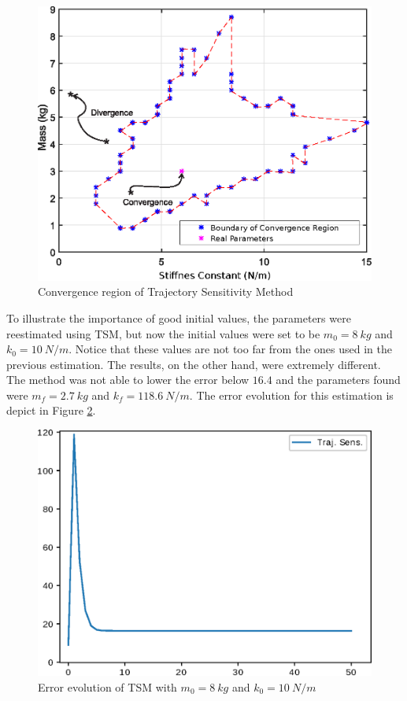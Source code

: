 \begin{figure}[h]
	\caption{Convergence region of Trajectory Sensitivity Method}
	\begin{center}
		\includegraphics[scale=0.6]{Images/Conv_reg.eps}
	\end{center}
	\label{fig: conv_reg}
\end{figure}

To illustrate the importance of good initial values, the parameters were reestimated using TSM, but now the initial values were set to be $m_{0} = 8\ kg$ and $k_{0} = 10\ N/m$. Notice that these values are not too far from the ones used in the previous estimation. The results, on the other hand, were extremely different. The method was not able to lower the error below $16.4$ and the parameters found were $m_{f} = 2.7\ kg$ and $k_{f} = 118.6\ N/m$. The error evolution for this estimation is depict in Figure \ref{fig: TS_nconv}.

\begin{figure}[h]
	\caption{Error evolution of TSM with $m_{0} = 8\ kg$ and $k_{0} = 10\ N/m$}
	\begin{center}
		\includegraphics[scale=0.6]{Images/TS_nconv.eps}
	\end{center}
	\label{fig: TS_nconv}
\end{figure}

